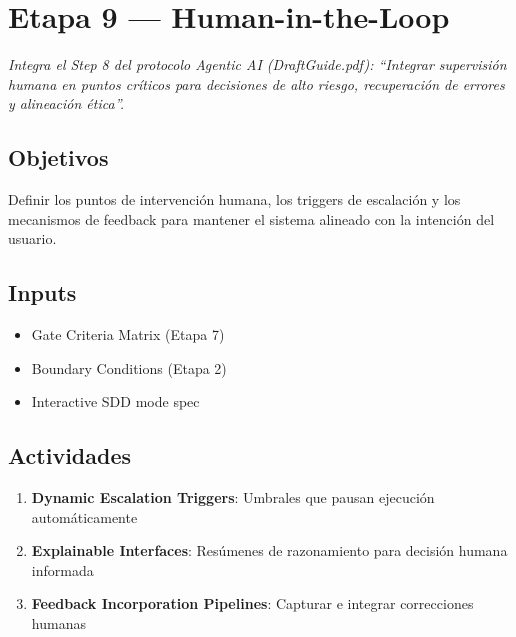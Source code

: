 \documentclass[12pt,a4paper]{article}
\begin{document}
\section{Etapa 9 --- Human-in-the-Loop}

\emph{Integra el Step 8 del protocolo Agentic AI (DraftGuide.pdf): ``Integrar supervisión humana en puntos críticos para decisiones de alto riesgo, recuperación de errores y alineación ética''.}

\subsection*{Objetivos}
Definir los puntos de intervención humana, los triggers de escalación y los mecanismos de feedback para mantener el sistema alineado con la intención del usuario.

\subsection*{Inputs}
\begin{itemize}
  \item Gate Criteria Matrix (Etapa 7)
  \item Boundary Conditions (Etapa 2)
  \item Interactive SDD mode spec
\end{itemize}

\subsection*{Actividades}
\begin{enumerate}
  \item \textbf{Dynamic Escalation Triggers}: Umbrales que pausan ejecución automáticamente
  \item \textbf{Explainable Interfaces}: Resúmenes de razonamiento para decisión humana informada
  \item \textbf{Feedback Incorporation Pipelines}: Capturar e integrar correcciones humanas
\end{enumerate}
\end{document}

